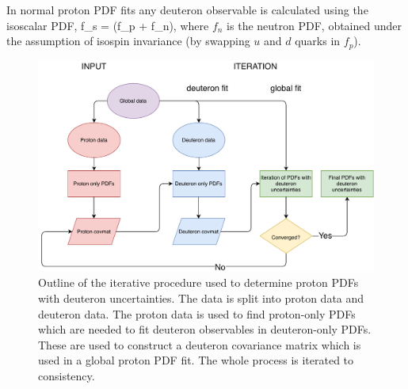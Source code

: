 In normal proton PDF fits any deuteron observable is calculated using the isoscalar PDF, 
\be
\label{eqn:iso}
f_s =  (f_p + f_n),
\ee
where $f_n$ is the neutron PDF, obtained under the assumption of isospin invariance (by swapping $u$ and $d$ quarks in $f_p$).
\begin{figure}[H]
  \begin{center}
    \includegraphics[width=\linewidth]{nuclear/plots/deut_flowchart.pdf}
   \caption{ Outline of the iterative procedure used to determine proton PDFs with deuteron uncertainties. The data is split into proton data and deuteron data. The proton data is used to find proton-only PDFs which are needed to fit deuteron observables in deuteron-only PDFs. These are used to construct a deuteron covariance matrix which is used in a global proton PDF fit. The whole process is iterated to consistency.
    \label{fig:flowchart} }
  \end{center}
\end{figure}


